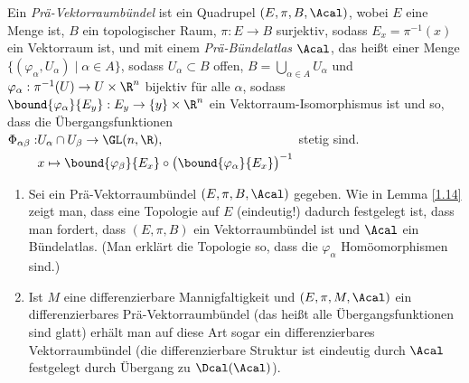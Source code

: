 \begin{defn}  
	Ein \emph{Prä-Vektorraumbündel} ist ein Quadrupel $ (E,\pi,B,\Acal) $, wobei $E$ eine Menge ist, $B$ ein topologischer Raum, $\pi: E \to B$ surjektiv, sodass $E_x = \pi^{-1}(x)$ ein Vektorraum ist, und mit einem \emph{Prä-Bündelatlas} $\Acal$, das heißt einer Menge $ \{(\varphi_\alpha,U_\alpha) \mid \alpha \in A\} $, sodass $U_\alpha \subset B$ offen, $ B = \bigcup_{\alpha \in A} U_\alpha $ und $ \varphi_\alpha: \pi^{-1}(U) \to U \times \R^n $ bijektiv für alle $\alpha$, sodass $ \bound{\varphi_\alpha}{E_y}: E_y \to \{y\} \times \R^n $ ein Vektorraum-Isomorphismus ist und so, dass die Übergangsfunktionen 
	$ \begin{aligned}[t]
		\Phi_{\alpha \beta}: &U_\alpha \cap U_\beta \to \GL(n,\R),\\
		 &x \mapsto \bound{\varphi_\beta}{E_x} \circ \big( \bound{\varphi_\alpha}{E_x} \big)^{-1}
	\end{aligned} $ stetig sind.
\end{defn}

\begin{rem}
	\begin{enumerate}[label= {\roman*})]
		\item Sei ein Prä-Vektorraumbündel $ (E,\pi,B,\Acal) $ gegeben. Wie in Lemma \ref{1.14} zeigt man, dass eine Topologie auf $E$ (eindeutig!) dadurch festgelegt ist, dass man fordert, dass $(E,\pi,B)$ ein Vektorraumbündel ist und $\Acal$ ein Bündelatlas. (Man erklärt die Topologie so, dass die $\varphi_\alpha$ Homöomorphismen sind.)
		\item Ist $M$ eine differenzierbare Mannigfaltigkeit und $ (E,\pi,M,\Acal) $ ein differenzierbares Prä-Vektorraumbündel (das heißt alle Übergangsfunktionen sind glatt) erhält man auf diese Art sogar ein differenzierbares Vektorraumbündel (die differenzierbare Struktur ist eindeutig durch $\Acal$ festgelegt durch Übergang zu $\Dcal(\Acal)$).
	\end{enumerate}
\end{rem}

